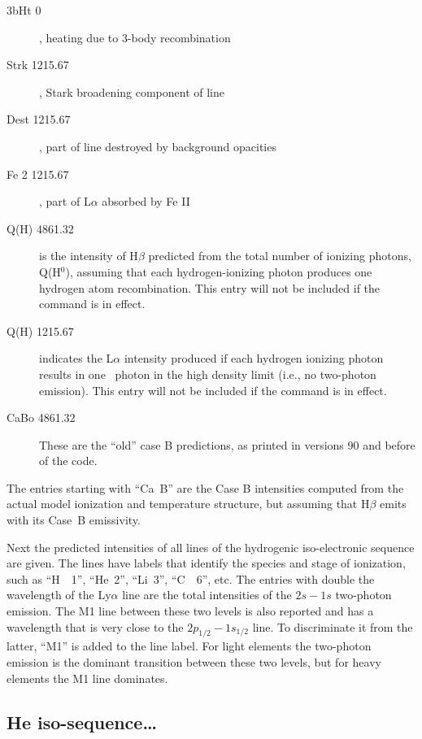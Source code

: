 \begin{description}
\item[3bHt    0], heating due to 3-body recombination

\item[Strk 1215.67], Stark broadening component of line

\item[Dest 1215.67], part of line destroyed by background opacities

\item[Fe 2 1215.67], part of L$\alpha $ absorbed by Fe II

\item[Q(H) 4861.32] is the intensity of H$\beta$ predicted from the total number of
ionizing photons, Q(H$^0$), assuming that each hydrogen-ionizing photon produces
one hydrogen atom recombination. This entry will not be included if the 
command is in effect.

\item[Q(H) 1215.67] indicates the L$\alpha $ intensity produced if each hydrogen ionizing
photon results in one \la\  photon in the high density limit (i.e., no
two-photon emission). This entry will not be included if the 
command is in effect.

\item[CaBo 4861.32] These are the ``old'' case B predictions, as printed in versions
90 and before of the code.
\end{description}

 The entries starting with ``Ca~B''
are the Case B intensities
computed from the actual model ionization and temperature structure, but
assuming that H$\beta$ emits with its Case~B emissivity.

Next the predicted intensities of all lines of the hydrogenic
iso-electronic sequence are given.
The lines have labels that identify
the species and stage of ionization,
such as ``H~~1'', ``He~2'', ``Li~3'', ``C~~6'', etc.
The entries with double the wavelength of the Ly$\alpha$ line are the total intensities
of the $2s-1s$ two-photon emission. The M1 line between these two levels is also reported
and has a wavelength that is very close to the $2p_{1/2}-1s_{1/2}$ line. To discriminate it from
the latter, ``M1'' is added to the line label. For light elements the two-photon emission
is the dominant transition between these two levels, but for heavy elements the M1 line dominates.

\subsection{He iso-sequence\dots }

